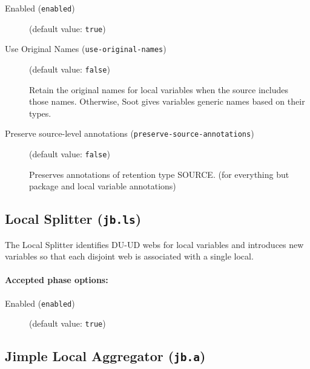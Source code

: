 \documentclass{article}
\begin{document}
\begin{description}

\item[Enabled ({\tt enabled})]
(default value: {\tt true})






\item[Use Original Names ({\tt use-original-names})]
(default value: {\tt false})




Retain the original names for local variables when the source
includes those names.  Otherwise, Soot gives variables generic
names based on their types.



\item[Preserve source-level annotations ({\tt preserve-source-annotations})]
(default value: {\tt false})




Preserves annotations of retention type SOURCE. (for
everything but package and local variable annotations) 



\end{description}

\subsection{Local Splitter ({\tt jb.ls})}

The Local Splitter identifies DU-UD webs for local variables and
introduces new variables so that each disjoint web is associated
with a single local.


\paragraph{Accepted phase options:} 

\begin{description}

\item[Enabled ({\tt enabled})]
(default value: {\tt true})






\end{description}

\subsection{Jimple Local Aggregator ({\tt jb.a})}
\end{document}
